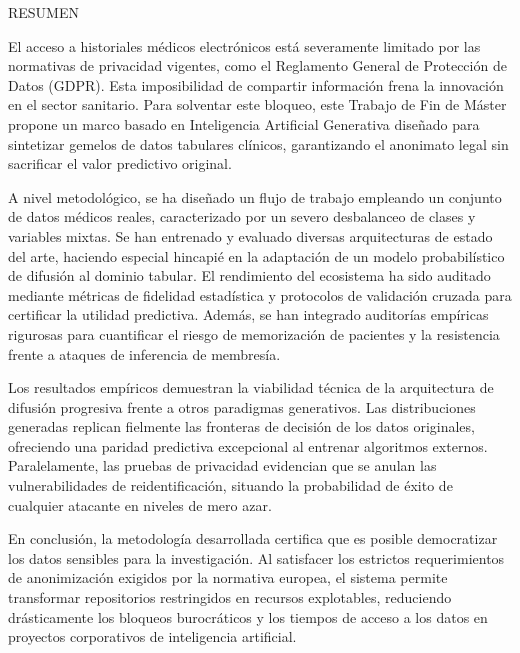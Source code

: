 \newpage
\setcounter{page}{2}
\thispagestyle{fancy}

{\fontsize{16pt}{19pt}\selectfont\color{uaxblue} RESUMEN}\par

El acceso a historiales médicos electrónicos está severamente limitado por las normativas de privacidad vigentes, como el Reglamento General de Protección de Datos (GDPR). Esta imposibilidad de compartir información frena la innovación en el sector sanitario. Para solventar este bloqueo, este Trabajo de Fin de Máster propone un marco basado en Inteligencia Artificial Generativa diseñado para sintetizar gemelos de datos tabulares clínicos, garantizando el anonimato legal sin sacrificar el valor predictivo original.

A nivel metodológico, se ha diseñado un flujo de trabajo empleando un conjunto de datos médicos reales, caracterizado por un severo desbalanceo de clases y variables mixtas. Se han entrenado y evaluado diversas arquitecturas de estado del arte, haciendo especial hincapié en la adaptación de un modelo probabilístico de difusión al dominio tabular. El rendimiento del ecosistema ha sido auditado mediante métricas de fidelidad estadística y protocolos de validación cruzada para certificar la utilidad predictiva. Además, se han integrado auditorías empíricas rigurosas para cuantificar el riesgo de memorización de pacientes y la resistencia frente a ataques de inferencia de membresía.

Los resultados empíricos demuestran la viabilidad técnica de la arquitectura de difusión progresiva frente a otros paradigmas generativos. Las distribuciones generadas replican fielmente las fronteras de decisión de los datos originales, ofreciendo una paridad predictiva excepcional al entrenar algoritmos externos. Paralelamente, las pruebas de privacidad evidencian que se anulan las vulnerabilidades de reidentificación, situando la probabilidad de éxito de cualquier atacante en niveles de mero azar.

En conclusión, la metodología desarrollada certifica que es posible democratizar los datos sensibles para la investigación. Al satisfacer los estrictos requerimientos de anonimización exigidos por la normativa europea, el sistema permite transformar repositorios restringidos en recursos explotables, reduciendo drásticamente los bloqueos burocráticos y los tiempos de acceso a los datos en proyectos corporativos de inteligencia artificial.

